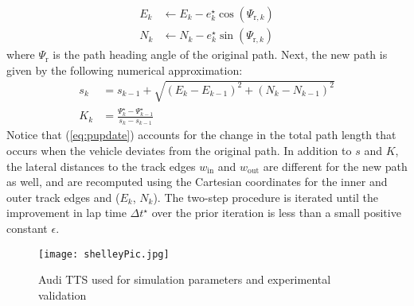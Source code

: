 \documentclass[twocolumn,10pt]{asme2ej}
\begin{document}
\begin{subequations}
\begin{align}
	E_k &\gets E_k - e^\star_k\cos(\Psi_{\mathrm{r},k})\\
	N_k &\gets N_k - e^\star_k\sin(\Psi_{\mathrm{r},k})
\end{align}
\end{subequations}
where $\Psi_\mathrm{r}$ is the path heading angle of the original path. Next, the new path is given by the following numerical approximation:
 \begin{subequations}
 \label{eq:pupdate}
\begin{align}
	s_k &= s_{k-1} + \sqrt{(E_k - E_{k-1})^2 + (N_k - N_{k-1})^2}\\ 
	K_k &= \frac{\Psi^\star_k - \Psi^\star_{k-1}}{s_k - s_{k-1}}
\end{align}
\end{subequations}
 Notice that (\ref{eq:pupdate}) accounts for the change in the total path length that occurs when the vehicle deviates from the original path.
 In addition to $s$ and $K$, the lateral distances to the track edges $w_\mathrm{in}$ and $w_\mathrm{out}$ are different for the new path
 as well, and are recomputed using the Cartesian coordinates for
the inner and outer track edges and ($E_k$, $N_k$). The two-step procedure is iterated until the improvement in lap time $\Delta t^\star$ over the prior iteration is less than a small positive 
constant $\epsilon$.

 \begin{figure}
\centering
\texttt{[image: shelleyPic.jpg]}
\caption{Audi TTS used for simulation parameters and experimental validation}
\label{fig:shelleyPic}
\end{figure}
\end{document}
